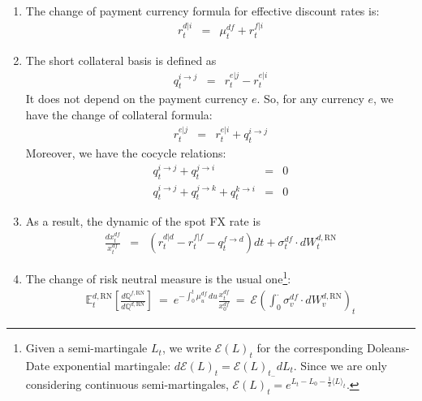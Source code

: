\documentclass[11pt,english]{amsart}
\newcommand{\RN}{\mathrm{RN}}
\newcommand{\EE}{\mathbb{E}}
\newcommand{\QQ}{\mathbb{Q}}
\theoremstyle{definition}
\begin{document}
\begin{enumerate}
\begin{eqnarray}
	\mu^{df}_t + \mu^{fd}_t  &=& 0 \\
	\mu^{de}_t + \mu^{ef}_t + \mu^{fd}_t  &=& 0 .
\end{eqnarray} 
\item The change of payment currency formula for effective discount rates is: 
\begin{eqnarray}
	r^{d|i}_t &=& \mu^{df}_t + r^{f|i}_t
\end{eqnarray} 
\item The short collateral basis is defined as 
\begin{eqnarray}
	q^{i\to j}_t &=& r^{e|j}_t  - r^{e|i}_t
\end{eqnarray} 
It does not depend on the payment currency $e$. So, for any currency $e$, we have the change of collateral formula:
\begin{eqnarray}
	r^{e|j}_t &=&  r^{e|i}_t + q^{i\to j}_t
\end{eqnarray} 
Moreover, we have the cocycle relations:
\begin{eqnarray}
	q^{i\to j}_t + q^{j\to i}_t &=& 0 \\ 
	q^{i\to j}_t + q^{j\to k}_t + q^{k\to i}_t  &=& 0 
\end{eqnarray} 

\item As a result, the dynamic of the spot FX rate is 
\begin{eqnarray}
	\frac{dx^{df}_t}{x^{df}_t}&=& \left( r^{d|d}_t - r^{f|f}_t - q^{f\to d}_t\right) dt + \sigma^{df}_t\cdot dW^{d,\RN}_t 
\end{eqnarray} 
\item The change of risk neutral measure is the usual one\footnote{Given a semi-martingale $L_t$, we write $\mathcal{E}(L)_t$ for the corresponding Doleans-Date exponential martingale: $d\mathcal{E}(L)_t = \mathcal{E}(L)_{t_-}dL_t$. Since we are only considering continuous semi-martingales, $\mathcal{E}(L)_t = e^{L_t - L_0 - \frac{1}{2}\langle L\rangle_t}$.}:
\begin{eqnarray}
	\EE^{d,\RN}_t\left[\frac{d\QQ^{f,\RN}}{d\QQ^{d,\RN}}\right] 
	~=~ e^{-\int_0^t \mu^{df}_u\, du} \frac{x^{df}_t}{x^{df}_0} 
	~=~ \mathcal{E}\left(\int_0^\cdot \sigma^{df}_v \cdot dW^{d,\RN}_v \right)_t 
\end{eqnarray} 
\end{enumerate}




\end{document}
